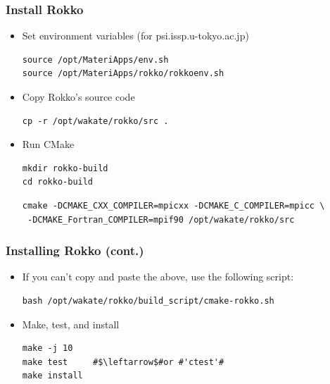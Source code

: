 \begin{frame}[c,fragile]
  \frametitle{Install Rokko}
  \begin{itemize}
  \item Set environment variables (for psi.issp.u-tokyo.ac.jp)
\begin{lstlisting}[style=shstyle]
source /opt/MateriApps/env.sh
source /opt/MateriApps/rokko/rokkoenv.sh
\end{lstlisting}
  \item Copy Rokko's source code
\begin{lstlisting}[style=shstyle]
cp -r /opt/wakate/rokko/src .
\end{lstlisting}
  \item Run CMake
\begin{lstlisting}[style=shstyle]
mkdir rokko-build
cd rokko-build
\end{lstlisting}
\begin{lstlisting}[style=shstyle]
cmake -DCMAKE_CXX_COMPILER=mpicxx -DCMAKE_C_COMPILER=mpicc \
 -DCMAKE_Fortran_COMPILER=mpif90 /opt/wakate/rokko/src
\end{lstlisting}
  \end{itemize}
\end{frame}

\lstset{escapechar=\#}
\begin{frame}[c,fragile]
  \frametitle{Installing Rokko (cont.)}
  \begin{itemize}
  \item If you can't copy and paste the above, use the following script:
\begin{lstlisting}[style=shstyle]
bash /opt/wakate/rokko/build_script/cmake-rokko.sh
\end{lstlisting}
  \item Make, test, and install
\begin{lstlisting}[style=shstyle]
make -j 10
make test     #$\leftarrow$#or #'ctest'#
make install
\end{lstlisting}
  \end{itemize}
\end{frame}




